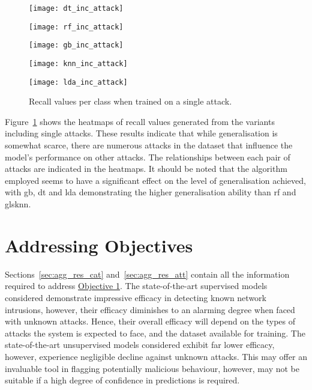 \begin{figure}[htbp]
    \centering
    \begin{minipage}[h]{0.5\textwidth}
        \centering
        \texttt{[image: dt\_inc\_attack]}
    \end{minipage}\hfill
    \begin{minipage}[h]{0.5\textwidth}
        \centering
        \texttt{[image: rf\_inc\_attack]}
    \end{minipage}
    \begin{minipage}[h]{0.5\textwidth}
        \centering
        \texttt{[image: gb\_inc\_attack]}
    \end{minipage}\hfill
    \begin{minipage}[h]{0.5\textwidth}
        \centering
        \texttt{[image: knn\_inc\_attack]}
    \end{minipage}
    \begin{minipage}[h]{0.5\textwidth}
        \centering
        \texttt{[image: lda\_inc\_attack]}
    \end{minipage}
    \caption[Single Individual Attack Results]{Recall values per class when trained on a single attack.\label{fig:inc_att}}
\end{figure}
%

Figure~\ref{fig:inc_att} shows the heatmaps of recall values generated from the
variants including single attacks. These results indicate that while
generalisation is somewhat scarce, there are numerous attacks in the dataset
that influence the model's performance on other attacks. The relationships
between each pair of attacks are indicated in the heatmaps. It should be noted
that the algorithm employed seems to have a significant effect on the level of
generalisation achieved, with \gls{gb}, \gls{dt} and \gls{lda} demonstrating
the higher generalisation ability than \gls{rf} and gls{knn}.

\section{Addressing Objectives}%
\label{sec:add_obj}

Sections~\ref{sec:agg_res_cat} and~\ref{sec:agg_res_att} contain all the
information required to address \hyperlink{obj}{Objective 1}. The
state-of-the-art supervised models considered demonstrate impressive efficacy
in detecting known network intrusions, however, their efficacy diminishes to an
alarming degree when faced with unknown attacks. Hence, their overall efficacy
will depend on the types of attacks the system is expected to face, and the
dataset available for training. The state-of-the-art unsupervised models
considered exhibit far lower efficacy, however, experience negligible decline
against unknown attacks. This may offer an invaluable tool in flagging
potentially malicious behaviour, however, may not be suitable if a high degree
of confidence in predictions is required.

